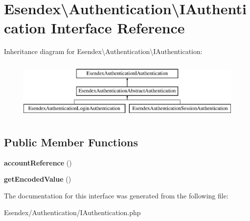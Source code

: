 \section{Esendex\textbackslash{}Authentication\textbackslash{}I\-Authentication Interface Reference}
\label{interface_esendex_1_1_authentication_1_1_i_authentication}
Inheritance diagram for Esendex\textbackslash{}Authentication\textbackslash{}I\-Authentication\-:\begin{figure}[H]
\begin{center}
\leavevmode
\includegraphics[height=2.968198cm]{interface_esendex_1_1_authentication_1_1_i_authentication}
\end{center}
\end{figure}
\subsection*{Public Member Functions}
\begin{DoxyCompactItemize}
\item 
{\bfseries account\-Reference} ()\label{interface_esendex_1_1_authentication_1_1_i_authentication_a11e9a31c7fab95cb34d2dbe543d7d801}

\item 
{\bfseries get\-Encoded\-Value} ()\label{interface_esendex_1_1_authentication_1_1_i_authentication_aa45f9a20b97d5eb17e49d762662d4952}

\end{DoxyCompactItemize}


The documentation for this interface was generated from the following file\-:\begin{DoxyCompactItemize}
\item 
Esendex/\-Authentication/I\-Authentication.\-php\end{DoxyCompactItemize}
